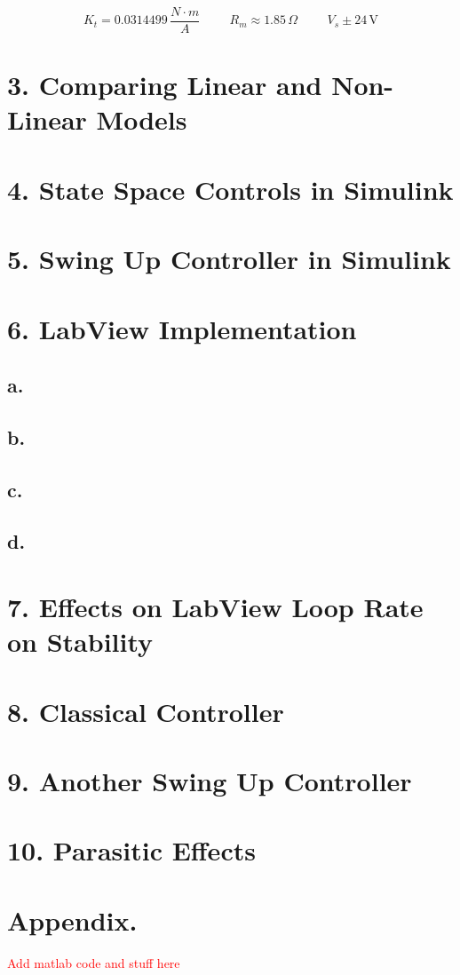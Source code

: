 \documentclass{article}
\newcommand{\xxx}[1]{\textcolor{red}{#1}}
\theoremstyle{plain}
\theoremstyle{definition}
\theoremstyle{remark}
\begin{document}
$$ K_t = 0.0314499 \, \frac{N \cdot m}{A} \hspace{1cm} R_m \approx 1.85 \, \Omega \hspace{1cm} V_s \pm 24 \, \text{V} $$

\section*{3. Comparing Linear and Non-Linear Models}

\section*{4. State Space Controls in Simulink}

\section*{5. Swing Up Controller in Simulink}

\section*{6. LabView Implementation}

\subsection*{a.}

\subsection*{b.}

\subsection*{c.}

\subsection*{d.}

\section*{7. Effects on LabView Loop Rate on Stability}

\section*{8. Classical Controller}

\section*{9. Another Swing Up Controller}

\section*{10. Parasitic Effects}

\section*{Appendix.}

\xxx{Add matlab code and stuff here}
\end{document}
